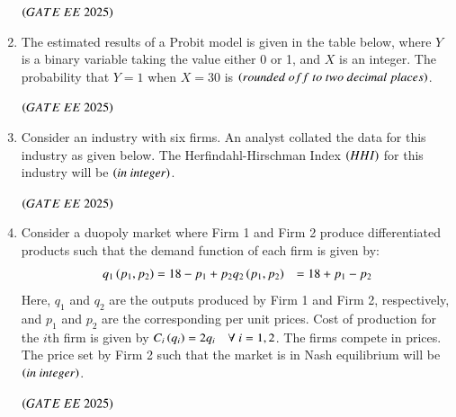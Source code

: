 \documentclass[journal,12pt,onecolumn]{IEEEtran}
\theoremstyle{remark}
\begin{document}
\begin{enumerate}
 \hfill $\brak{GATE\ EE\ 2025}$
\item The estimated results of a Probit model is given in the table below, where $Y$ is a binary variable taking the value either 0 or 1, and $X$ is an integer. The probability that $Y = 1$ when $X = 30$ is \underline{\hspace{2cm}} $\brak{rounded\ off \ to \ two\ decimal\ places}$.  

\begin{center}

\end{center}
 \hfill $\brak{GATE\ EE\ 2025}$
\item Consider an industry with six firms. An analyst collated the data for this industry as given below. The Herfindahl-Hirschman Index $\left(HHI\right)$ for this industry will be \underline{\hspace{2cm}} $\left(in\ integer\right)$.
\begin{center}

\end{center} 
 \hfill $\brak{GATE\ EE\ 2025}$
\item Consider a duopoly market where Firm 1 and Firm 2 produce differentiated products such that the demand function of each firm is given by:
\begin{align*}
q_1\left(p_1, p_2\right) &= 18 - p_1 + p_2  
q_2\left(p_1, p_2\right) &= 18 + p_1 - p_2
\end{align*}
Here, $q_1$ and $q_2$ are the outputs produced by Firm 1 and Firm 2, respectively, and $p_1$ and $p_2$ are the corresponding per unit prices. Cost of production for the $i$th firm is given by $C_i\left(q_i\right) = 2q_i \quad \forall~i=1,2$. The firms compete in prices. The price set by Firm 2 such that the market is in Nash equilibrium will be \underline{\hspace{2cm}} $\left(in\ integer\right)$. 

 \hfill $\brak{GATE\ EE\ 2025}$
\end{enumerate}
\renewcommand{\thefigure}{\theenumi}
\renewcommand{\thetable}{\theenumi}
\end{document}
